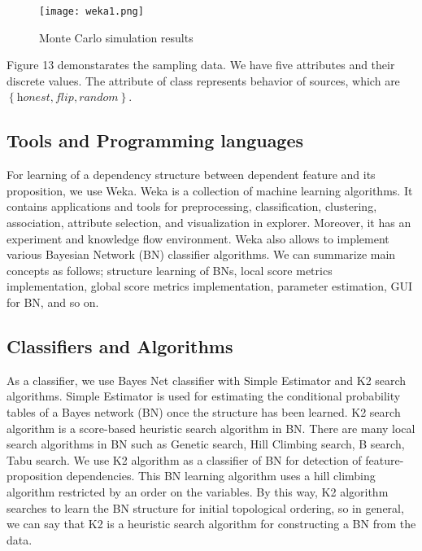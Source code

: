 \documentclass[a4,12pt]{ozu-thesis}
\begin{document}
\begin{figure}[h]
\label{fig:mcs}
\begin{minipage}{.5\textwidth}
\begin{center}
\texttt{[image: weka1.png]}
\end{center}
\caption{Monte Carlo simulation results}
\end{minipage}
\end{figure}

Figure 13 demonstarates the sampling data. We have five attributes and their discrete values. The attribute of class represents behavior of sources, which are $\left \{ \textit{honest}, \textit{flip}, \textit{random} \right \}$.


\subsection{Tools and Programming languages}
For learning of a dependency structure between dependent feature and its proposition, we use Weka\cite{weka}. Weka is a collection of machine learning algorithms. It contains applications and tools for preprocessing, classification, clustering, association, attribute selection, and visualization in explorer. Moreover, it has an experiment and knowledge flow environment. Weka also allows to implement various Bayesian Network (BN) classifier algorithms. We can summarize main concepts as follows; structure learning of BNs, local score metrics implementation, global score metrics implementation, parameter estimation, GUI for BN, and so on.

\subsection{Classifiers and Algorithms}
As a classifier, we use Bayes Net classifier with Simple Estimator and K2 search algorithms. Simple Estimator is used for estimating the conditional probability tables of a Bayes network (BN) once the structure has been learned. K2 search algorithm is a score-based heuristic search algorithm in BN. There are many local search algorithms in BN such as Genetic search, Hill Climbing search, B search, Tabu search. We use K2 algorithm as a classifier of BN for detection of feature-proposition dependencies. This BN learning algorithm uses a hill climbing algorithm restricted by an order on the variables. By this way, K2 algorithm searches to learn the BN structure for initial topological ordering, so in general, we can say that K2 is a heuristic search algorithm for constructing a BN from the data. 
\end{document}
